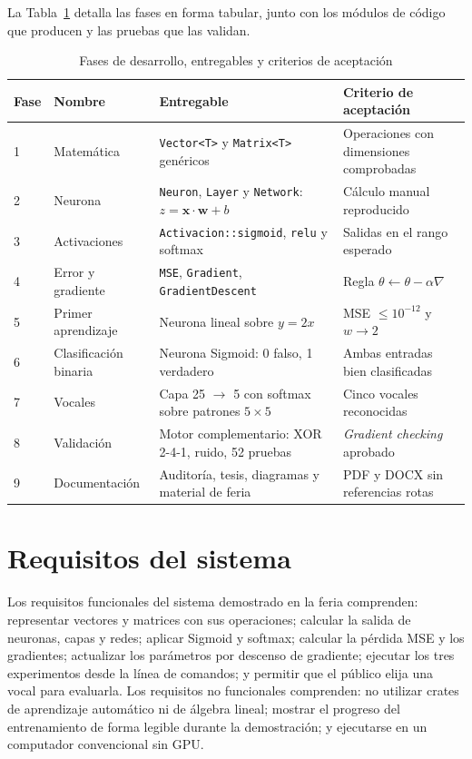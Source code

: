 La Tabla~\ref{tab:fases} detalla las fases en forma tabular, junto con los módulos de código que producen y las pruebas que las validan.

\begin{table}[!htbp]
\caption{Fases de desarrollo, entregables y criterios de aceptación}\label{tab:fases}
\small
\begin{tabularx}{\textwidth}{@{}l >{\raggedright}p{3.4cm} >{\raggedright}X >{\raggedright\arraybackslash}p{3.6cm}@{}}
\toprule
Fase & Nombre & Entregable & Criterio de aceptación \\
\midrule
1 & Matemática & \texttt{Vector<T>} y \texttt{Matrix<T>} genéricos & Operaciones con dimensiones comprobadas \\
2 & Neurona & \texttt{Neuron}, \texttt{Layer} y \texttt{Network}: $z=\mathbf{x}\cdot\mathbf{w}+b$ & Cálculo manual reproducido \\
3 & Activaciones & \texttt{Activacion::sigmoid}, \texttt{relu} y softmax & Salidas en el rango esperado \\
4 & Error y gradiente & \texttt{MSE}, \texttt{Gradient}, \texttt{GradientDescent} & Regla $\theta\leftarrow\theta-\alpha\nabla$ \\
5 & Primer aprendizaje & Neurona lineal sobre $y=2x$ & MSE $\le 10^{-12}$ y $w\to 2$ \\
6 & Clasificación binaria & Neurona Sigmoid: 0 falso, 1 verdadero & Ambas entradas bien clasificadas \\
7 & Vocales & Capa 25 $\to$ 5 con softmax sobre patrones $5\times5$ & Cinco vocales reconocidas \\
8 & Validación & Motor complementario: XOR 2-4-1, ruido, 52 pruebas & \emph{Gradient checking} aprobado \\
9 & Documentación & Auditoría, tesis, diagramas y material de feria & PDF y DOCX sin referencias rotas \\
\bottomrule
\end{tabularx}
\end{table}

\section{Requisitos del sistema}
Los requisitos funcionales del sistema demostrado en la feria comprenden: representar vectores y matrices con sus operaciones; calcular la salida de neuronas, capas y redes; aplicar Sigmoid y softmax; calcular la pérdida MSE y los gradientes; actualizar los parámetros por descenso de gradiente; ejecutar los tres experimentos desde la línea de comandos; y permitir que el público elija una vocal para evaluarla. Los requisitos no funcionales comprenden: no utilizar crates de aprendizaje automático ni de álgebra lineal; mostrar el progreso del entrenamiento de forma legible durante la demostración; y ejecutarse en un computador convencional sin GPU.

